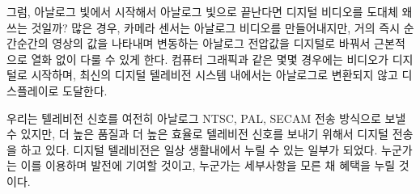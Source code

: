그럼, 아날로그 빛에서 시작해서 아날로그 빛으로 끝난다면 디지털 비디오를 도대체 왜 쓰는 것일까?
많은 경우, 카메라 센서는 아날로그 비디오를 만들어내지만, 거의 즉시 순간순간의 영상의 값을 나타내며 변동하는 아날로그 전압값을 디지털로 바꿔서 근본적으로 열화 없이 다룰 수 있게 한다.
컴퓨터 그래픽과 같은 몇몇 경우에는 비디오가 디지털로 시작하며, 최신의 디지털 텔레비전 시스템 내에서는 아날로그로 변환되지 않고 디스플레이로 도달한다.


우리는 텔레비전 신호를 여전히 아날로그 NTSC, PAL, SECAM 전송 방식으로 보낼 수 있지만, 더 높은 품질과 더 높은 효율로 텔레비전 신호를 보내기 위해서 디지털 전송을 하고 있다.
디지털 텔레비전은 일상 생활내에서 누릴 수 있는 일부가 되었다. 누군가는 이를 이용하며 발전에 기여할 것이고, 누군가는 세부사항을 모른 채 혜택을 누릴 것이다.